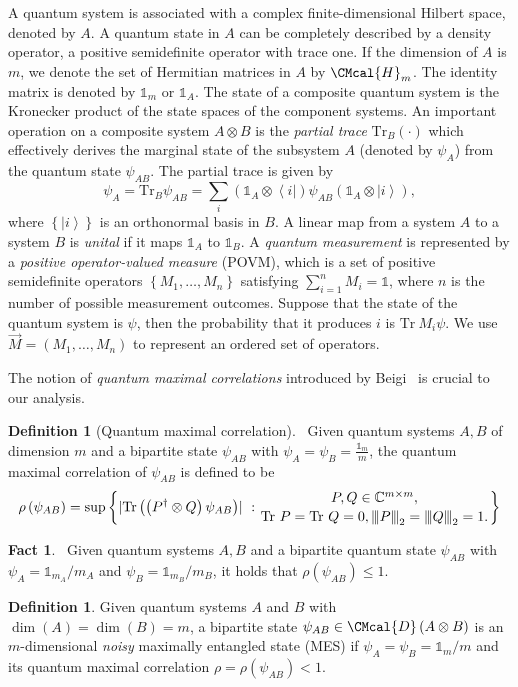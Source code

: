 \documentclass[10pt,a4paper]{article}
\def\D{\CMcal{D}}
\def\H{\CMcal{H}}
\theoremstyle{plain}
\theoremstyle{definition}
\newtheorem{definition}[theorem]{Definition}
\newtheorem{fact}[theorem]{Fact}
\newcommand {\set} [1] {\ensuremath{ \left\lbrace #1 \right\rbrace }}
\newcommand {\br} [1] {\ensuremath{ \left( #1 \right) }}
\DeclarePairedDelimiter{\abs}{\lvert}{\rvert}
\newcommand {\bra} [1] {\ensuremath{ \left\langle #1 \right| }}
\newcommand {\ket} [1] {\ensuremath{ \left| #1 \right\rangle }}
\newcommand{\nnorm}[1]{{\left\vert\kern-0.25ex\left\vert\kern-0.25ex\left\vert #1
		\right\vert\kern-0.25ex\right\vert\kern-0.25ex\right\vert}}
\newcommand {\Tr} {\ensuremath{ \mathrm{Tr} }}
\newcommand {\id} {\ensuremath{\mathds{1}}}
\renewcommand{\vec}[1]{\stackrel{\longrightarrow}{#1}}
\newcommand{\1}{\mathbb{1}} %
\begin{document}
A quantum system is associated with a complex finite-dimensional Hilbert space, denoted by $A$. A quantum state in $A$ can be completely described by a density operator, a positive semidefinite operator with trace one. If the dimension of $A$ is $m$, we denote the set of Hermitian matrices in $A$ by $\H_m$. The identity matrix is denoted by $\id_m$ or $\id_A$. The state of a composite quantum system is the Kronecker product of the state spaces of the component systems. An important operation on a composite system $A\otimes B$ is the {\em partial trace} $\Tr_B\br{\cdot}$ which effectively derives the marginal state of the subsystem $A$ (denoted by $\psi_A$) from the quantum state $\psi_{AB}$.  The partial trace is given by \[\psi_A=\Tr_B\psi_{AB}=\sum_i\br{\id_A\otimes\bra{i}}\psi_{AB}\br{\id_A\otimes\ket{i}},\] where $\set{\ket{i}}$ is an orthonormal basis in $B$. A linear map from a system $A$ to a system $B$ is {\em unital} if it maps $\id_A$ to $\id_B$.  A {\em quantum measurement} is represented by a {\em positive operator-valued measure} (POVM), which is a set of positive semidefinite operators $\set{M_1,\ldots, M_n}$ satisfying $\sum_{i=1}^nM_i=\id$, where $n$ is the number of possible measurement outcomes. Suppose that the state of the quantum system is $\psi$, then the probability that it produces $i$ is $\Tr~ M_i\psi$. We use $\vec{M}=\br{M_1,\ldots, M_n}$ to represent an ordered set of operators.


The notion of {\em quantum maximal correlations} introduced by Beigi~\cite{Beigi:2013} is crucial to our analysis. 
\begin{definition}[Quantum maximal correlation]~\cite{Beigi:2013}\label{def:maximalcorrelation}
	Given quantum systems $A, B$ of dimension $m$ and a bipartite state $\psi_{AB}$ with $\psi_A=\psi_B=\frac{\id_{m}}{m}$, the quantum maximal correlation of $\psi_{AB}$ is defined to be
	\[\rho\br{\psi_{AB}}=\sup\set{\abs{\Tr\br{\br{P^{\dagger}\otimes Q}\psi_{AB}}}~:\genfrac{}{}{0pt}{}{P, Q\in\mathbb{C}^{m\times m},}{\Tr~P=\Tr~Q=0, \nnorm{P}_2=\nnorm{Q}_2=1.}}\]
\end{definition}



\begin{fact}~\cite{Beigi:2013}\label{fac:maximalcorrlationone}
	Given quantum systems $A, B$ and a bipartite quantum state $\psi_{AB}$ with $\psi_A=\id_{m_A}/m_A$ and $\psi_B=\id_{m_B}/m_B$, it holds that $\rho\br{\psi_{AB}}\leq 1$.
	\end{fact}
	
	\begin{definition}\label{def:noisyepr}
		Given quantum systems $A$ and $B$ with $\dim\br{A}=\dim\br{B}=m$, a bipartite state $\psi_{AB}\in\D\br{A\otimes B}$ is an $m$-dimensional \emph{noisy} maximally entangled state (MES) if $\psi_A=\psi_B=\id_m/m$ and its quantum maximal correlation $\rho=\rho\br{\psi_{AB}}<1$.
	\end{definition}
\end{document}
